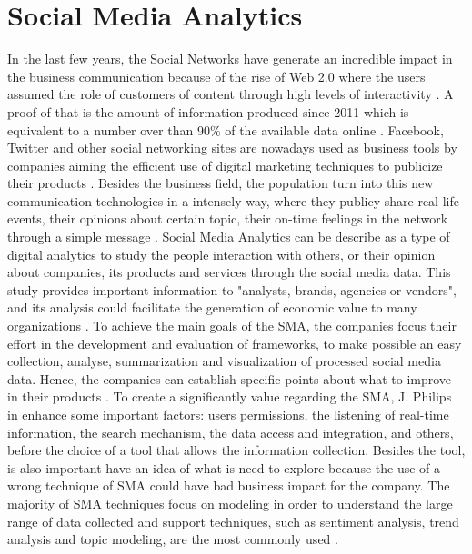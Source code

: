 \section{Social Media Analytics}\label{sec:socialmedia}
In the last few years, the Social Networks have generate an incredible impact in the business communication because of the rise of Web 2.0 where the users assumed the role of customers of content through high levels of interactivity \cite{kn:Cecilia2016}. A proof of that is the amount of information produced since 2011 which is equivalent to a number over than 90\% of the available data online \cite{kn:SINTEF}. Facebook, Twitter and other social networking sites are nowadays used as business tools by companies aiming the efficient use of digital marketing techniques to publicize their products \cite{kn:Royle2014}. Besides the business field, the population turn into this new communication technologies in a intensely way, where they publicy share real-life events, their opinions about certain topic, their on-time feelings in the network through a simple message \cite{kn:DAndrea2015}.
Social Media Analytics can be describe as a type of digital analytics to study the people interaction with others, or their opinion about companies, its products and  services through the social media data. This study provides important information to "analysts, brands, agencies or vendors", and its analysis could facilitate the generation of economic value to many organizations \cite{kn:Judah2012}.
To achieve the main goals of the SMA, the companies focus their effort in the development and evaluation of frameworks, to make possible an easy collection, analyse, summarization and visualization of processed social media data. Hence, the companies can establish specific points about what to improve in their products \cite{kn:Zeng2010}.
To create a significantly value regarding the SMA, J. Philips in \cite{kn:Judah2012} enhance some important factors: users permissions, the listening of real-time information, the search mechanism, the data access and integration, and others, before the choice of a tool that allows the information collection. Besides the tool, is also important have an idea of what is need to explore because the use of a wrong technique of SMA could have bad business impact for the company. The majority of SMA techniques focus on modeling in order to understand the large range of data collected and support techniques, such as sentiment analysis, trend analysis and topic modeling, are the most commonly used \cite{kn:Fan2013}.

